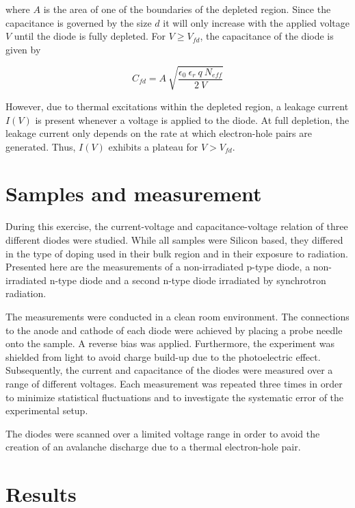 \documentclass[11pt,a4paper]{report}
\begin{document}
where $A$ is the area of one of the boundaries of the depleted region. Since the capacitance is governed by the size $d$ it will only increase with the applied voltage $V$ until the diode is fully depleted. For $V \geq V_{fd}$, the capacitance of the diode is given by

\begin{equation}
  \label{eq:1}
   C_{fd} = A ~ \sqrt{\frac{\epsilon_0 ~ \epsilon_r ~q ~ N_{eff}}{2 ~ V}}
\end{equation}

However, due to thermal excitations within the depleted region, a leakage current $I(V)$ is present whenever a voltage is applied to the diode.
At full depletion, the leakage current only depends on the rate at which electron-hole pairs are generated. Thus, $I(V)$ exhibits a plateau for $V>V_{fd}$. \\


\section*{Samples and measurement}
\label{sec:samples}

During this exercise, the current-voltage and capacitance-voltage relation of three different diodes were studied. While all samples were Silicon based, they differed in the type of doping used in their bulk region and in their exposure to radiation.
Presented here are the measurements of a non-irradiated p-type diode, a non-irradiated n-type diode and a second n-type diode irradiated by synchrotron radiation. 

The measurements were conducted in a clean room environment. The connections to the anode and cathode of each diode were achieved by placing a probe needle onto the sample.
A reverse bias was applied.
Furthermore, the experiment was shielded from light to avoid charge build-up due to the photoelectric effect. Subsequently, the current and capacitance of the diodes were measured over a range of different voltages. Each measurement was repeated three times in order to minimize statistical fluctuations and to investigate the systematic error of the experimental setup.

The diodes were scanned over a limited voltage range in order to avoid the creation of an avalanche discharge due to a thermal electron-hole pair.


\section*{Results}
\end{document}
